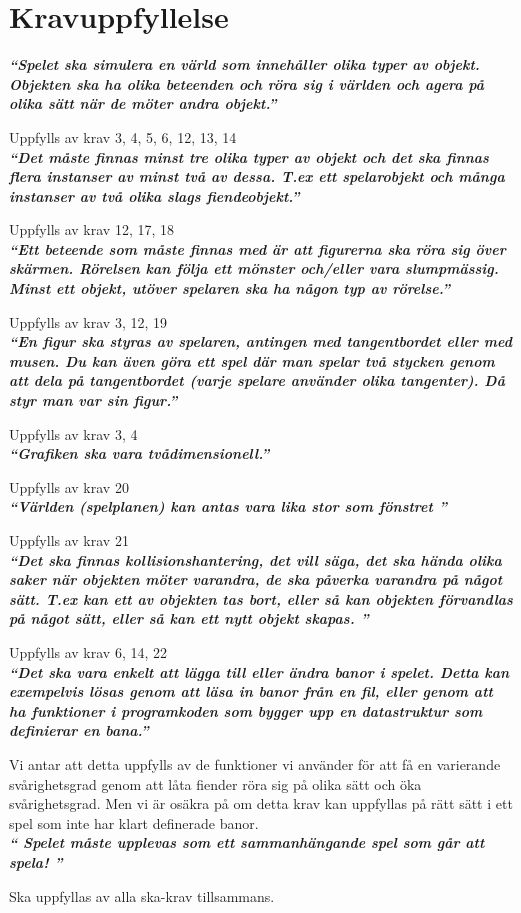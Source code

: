 \documentclass{TDP005mall}
\begin{document}
\section{Kravuppfyllelse}
\textit{\textbf{``Spelet ska simulera en värld som innehåller olika typer av objekt. Objekten ska ha olika beteenden och röra sig i världen och agera på olika sätt när de möter andra objekt.''}}


Uppfylls av krav 3, 4, 5, 6, 12, 13, 14\\


\textit{\textbf{``Det måste finnas minst tre olika typer av objekt och det ska finnas flera instanser av minst två av dessa. T.ex ett spelarobjekt och många instanser av två olika slags fiendeobjekt.''}}


Uppfylls av krav 12, 17, 18\\

\textit{\textbf{``Ett beteende som måste finnas med är att figurerna ska röra sig över skärmen. Rörelsen kan följa ett mönster och/eller vara slumpmässig. Minst ett objekt, utöver spelaren ska ha någon typ av rörelse.''}}


Uppfylls av krav 3, 12, 19\\

\textit{\textbf{``En figur ska styras av spelaren, antingen med tangentbordet eller med musen. Du kan även göra ett spel där man spelar två stycken genom att dela på tangentbordet (varje spelare använder olika tangenter). Då styr man var sin figur.''}}


Uppfylls av krav 3, 4\\

\textit{\textbf{``Grafiken ska vara tvådimensionell.''}}


Uppfylls av krav 20\\

\textit{\textbf{``Världen (spelplanen) kan antas vara lika stor som fönstret ''}}


Uppfylls av krav 21\\

\textit{\textbf{``Det ska finnas kollisionshantering, det vill säga, det ska hända olika saker när objekten möter varandra, de ska påverka varandra på något sätt. T.ex kan ett av objekten tas bort, eller så kan objekten förvandlas på något sätt, eller så kan ett nytt objekt skapas. ''}}


Uppfylls av krav 6, 14, 22\\

\textit{\textbf{``Det ska vara enkelt att lägga till eller ändra banor i spelet. Detta kan exempelvis lösas genom att läsa in banor från en fil, eller genom att ha funktioner i programkoden som bygger upp en datastruktur som definierar en bana.''}}


Vi antar att detta uppfylls av de funktioner vi använder för att få en varierande svårighetsgrad genom att låta fiender röra sig på olika sätt och öka svårighetsgrad. Men vi är osäkra på om detta krav kan uppfyllas på rätt sätt i ett spel som inte har klart definerade banor.\\

\textit{\textbf{`` Spelet måste upplevas som ett sammanhängande spel som går att spela! ''}}

Ska uppfyllas av alla ska-krav tillsammans.
\end{document}
